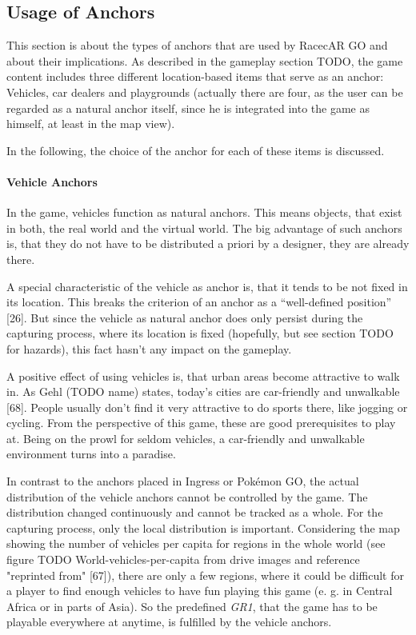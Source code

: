 \subsection{Usage of Anchors}
This section is about the types of anchors that are used by RacecAR GO and about their implications. As described in the gameplay section TODO, the game content includes three different location-based items that serve as an anchor: Vehicles, car dealers and playgrounds (actually there are four, as the user can be regarded as a natural anchor itself, since he is integrated into the game as himself, at least in the map view).

In the following, the choice of the anchor for each of these items is discussed.

\paragraph{Vehicle Anchors}
In the game, vehicles function as natural anchors. This means objects, that exist in both, the real world and the virtual world. The big advantage of such anchors is, that they do not have to be distributed a priori by a designer, they are already there.

A special characteristic of the vehicle as anchor is, that it tends to be not fixed in its location. This breaks the criterion of an anchor as a “well-defined position” [26]. But since the vehicle as natural anchor does only persist during the capturing process, where its location is fixed (hopefully, but see section TODO for hazards), this fact hasn’t any impact on the gameplay.

A positive effect of using vehicles is, that urban areas become attractive to walk in. As Gehl (TODO name) states, today’s cities are car-friendly and unwalkable [68]. People usually don’t find it very attractive to do sports there, like jogging or cycling. From the perspective of this game, these are good prerequisites to play at. Being on the prowl for seldom vehicles, a car-friendly and unwalkable environment turns into a paradise.

In contrast to the anchors placed in Ingress or Pokémon GO, the actual distribution of the vehicle anchors cannot be controlled by the game. The distribution changed continuously and cannot be tracked as a whole. For the capturing process, only the local distribution is important. Considering the map showing the number of vehicles per capita for regions in the whole world (see figure TODO World-vehicles-per-capita from drive images and reference "reprinted from" [67]), there are only a few regions, where it could be difficult for a player to find enough vehicles to have fun playing this game (e. g. in Central Africa or in parts of Asia). So the predefined \emph{GR1}, that the game has to be playable everywhere at anytime, is fulfilled by the vehicle anchors.

